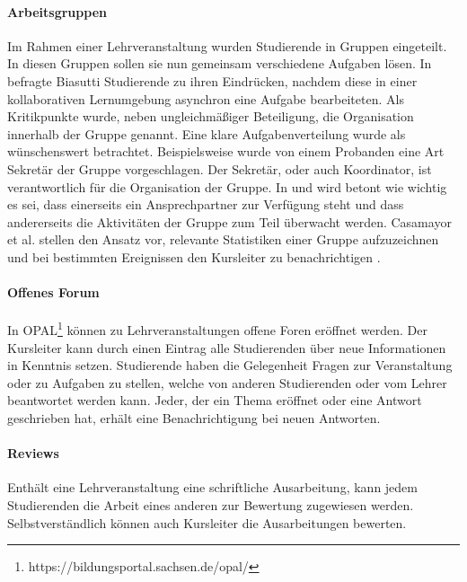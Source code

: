\documentclass[conference]{IEEEtran}
\begin{document}
\paragraph{Arbeitsgruppen} Im Rahmen einer Lehrveranstaltung wurden Studierende in Gruppen eingeteilt. In diesen Gruppen sollen sie nun gemeinsam verschiedene Aufgaben lösen. In \cite{dewiyanti2007students} befragte Biasutti Studierende zu ihren Eindrücken, nachdem diese in einer kollaborativen Lernumgebung asynchron eine Aufgabe bearbeiteten. Als Kritikpunkte wurde, neben ungleichmäßiger Beteiligung, die Organisation innerhalb der Gruppe genannt. Eine klare Aufgabenverteilung wurde als wünschenswert betrachtet. Beispielsweise wurde von einem Probanden eine Art Sekretär der Gruppe vorgeschlagen. Der Sekretär, oder auch Koordinator, ist verantwortlich für die Organisation der Gruppe. In \cite{paechter2010students} und \cite{casamayor2009intelligent} wird betont wie wichtig es sei, dass einerseits ein Ansprechpartner zur Verfügung steht und dass  andererseits die Aktivitäten der Gruppe zum Teil überwacht werden. Casamayor et al. stellen den Ansatz vor, relevante Statistiken einer Gruppe aufzuzeichnen und bei bestimmten Ereignissen den Kursleiter zu benachrichtigen \cite{casamayor2009intelligent}. 
\paragraph{Offenes Forum} In OPAL\footnote{https://bildungsportal.sachsen.de/opal/} können zu Lehrveranstaltungen offene Foren eröffnet werden. Der Kursleiter kann durch einen Eintrag alle Studierenden über neue Informationen in Kenntnis setzen. Studierende haben die Gelegenheit Fragen zur Veranstaltung oder zu Aufgaben zu stellen, welche von anderen Studierenden oder vom Lehrer beantwortet werden kann. Jeder, der ein Thema eröffnet oder eine Antwort geschrieben hat, erhält eine Benachrichtigung bei neuen Antworten. 
\paragraph{Reviews} Enthält eine Lehrveranstaltung eine schriftliche Ausarbeitung, kann jedem Studierenden die Arbeit eines anderen zur Bewertung zugewiesen werden. Selbstverständlich können auch Kursleiter die Ausarbeitungen bewerten. 
	


	
\end{document}
